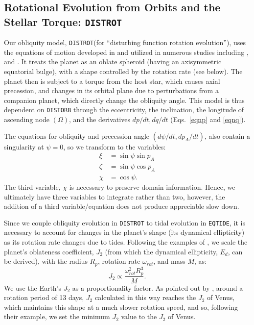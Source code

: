 \documentclass[preprint,12pt]{aastex}
\def\distorb{\texttt{\footnotesize{DISTORB}}\xspace}
\def\distrot{\texttt{\footnotesize{DISTROT}}\xspace}
\def\eqtide{\texttt{\footnotesize{EQTIDE}}\xspace}
\begin{document}
\subsection{Rotational Evolution from Orbits and the Stellar Torque: \distrot}
\label{sec:models:distrot}
Our obliquity model, \distrot (for ``disturbing function rotation
evolution''), uses the equations of motion developed in
\cite{Kinoshita1975, Kinoshita1977} and utilized in numerous studies 
including  \cite{Laskar1986,Laskar1993a,Laskar1993b}, and \cite{Armstrong14}.  
It treats the planet as an oblate spheroid (having an axisymmetric equatorial
bulge), with a shape controlled by the rotation rate (see below). The planet then is
subject to a torque from the host star, which causes axial precession,
and changes in its orbital plane due to perturbations from a companion
planet, which directly change the obliquity angle.  This model is thus
dependent on \distorb through the eccentricity, the inclination, the 
longitude of ascending node $(\Omega)$, and the derivatives $dp/dt,
dq/dt$ (Eqs.~\ref{eqnp} and \ref{eqnq}).

The equations for obliquity and precession angle $(d\psi/dt,
dp_A/dt)$, also contain a singularity at $\psi = 0$, so we transform
to the variables:
\begin{align}
\xi & = \sin{\psi} \sin{p_A} \\
\zeta & = \sin{\psi} \cos{p_A} \\
\chi & = \cos{\psi}.
\end{align}
The third variable, $\chi$ is necessary to preserve domain information. Hence,
we ultimately have three variables to integrate rather than two, however, the
addition of a third variable/equation does not produce appreciable slow down.

Since we couple obliquity evolution in \distrot to tidal evolution in \eqtide, it is 
necessary to account for changes in the planet's shape (its dynamical ellipticity)
as its rotation rate changes due to tides. Following the examples of 
\cite{Atobe2007, Brasser2014}, we scale the planet's oblateness coefficient, $J_2$ 
(from which the dynamical ellipticity, $E_d$, can be derived), with the radius $R_p$, 
rotation rate $\omega_{rot}$, and mass $M$, as:
\begin{equation}
J_2 \propto \frac{\omega_{rot}^2 R_p^3}{M}.
\end{equation}
We use the Earth's $J_2$ as a proportionality factor. As pointed out by 
\cite{Brasser2014}, around a rotation period of 13 days, $J_2$ calculated in this 
way reaches the $J_2$ of Venus, which maintains this shape at a much slower 
rotation speed, and so, following their example, we set the 
minimum $J_2$ value to the  $J_2$ of Venus.
 
\end{document}

